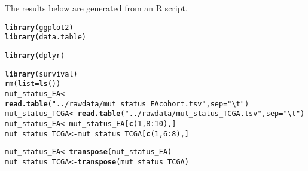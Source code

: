 \documentclass{article}\usepackage[]{graphicx}\usepackage[]{color}
\makeatletter
\newcommand{\hlnum}[1]{\textcolor[rgb]{0.686,0.059,0.569}{#1}}%
\newcommand{\hlstr}[1]{\textcolor[rgb]{0.192,0.494,0.8}{#1}}%
\newcommand{\hlopt}[1]{\textcolor[rgb]{0,0,0}{#1}}%
\newcommand{\hlstd}[1]{\textcolor[rgb]{0.345,0.345,0.345}{#1}}%
\newcommand{\hlkwb}[1]{\textcolor[rgb]{0.69,0.353,0.396}{#1}}%
\newcommand{\hlkwc}[1]{\textcolor[rgb]{0.333,0.667,0.333}{#1}}%
\newcommand{\hlkwd}[1]{\textcolor[rgb]{0.737,0.353,0.396}{\textbf{#1}}}%
\newenvironment{kframe}{%
 \def\at@end@of@kframe{}%
 \ifinner\ifhmode%
  \def\at@end@of@kframe{\end{minipage}}%
  \begin{minipage}{\columnwidth}%
 \fi\fi%
 \def\FrameCommand##1{\hskip\@totalleftmargin \hskip-\fboxsep
 \colorbox{shadecolor}{##1}\hskip-\fboxsep
     \hskip-\linewidth \hskip-\@totalleftmargin \hskip\columnwidth}%
 \MakeFramed {\advance\hsize-\width
   \@totalleftmargin\z@ \linewidth\hsize
   \@setminipage}}%
 {\par\unskip\endMakeFramed%
 \at@end@of@kframe}
\newenvironment{knitrout}{}{} %
\makeatother
\begin{document}
The results below are generated from an R script.

\begin{knitrout}
\color{fgcolor}\begin{kframe}
\begin{alltt}
\hlkwd{library}\hlstd{(ggplot2)}
\hlkwd{library}\hlstd{(data.table)}
\end{alltt}


{\ttfamily\noindent\itshape\color{messagecolor}{\#\# data.table 1.13.6 using 6 threads (see ?getDTthreads).\ \ Latest news: r-datatable.com}}\begin{alltt}
\hlkwd{library}\hlstd{(dplyr)}
\end{alltt}


{\ttfamily\noindent\itshape\color{messagecolor}{\#\# \\\#\# Attaching package: 'dplyr'}}

{\ttfamily\noindent\itshape\color{messagecolor}{\#\# The following objects are masked from 'package:data.table':\\\#\# \\\#\#\ \ \ \  between, first, last}}

{\ttfamily\noindent\itshape\color{messagecolor}{\#\# The following objects are masked from 'package:stats':\\\#\# \\\#\#\ \ \ \  filter, lag}}

{\ttfamily\noindent\itshape\color{messagecolor}{\#\# The following objects are masked from 'package:base':\\\#\# \\\#\#\ \ \ \  intersect, setdiff, setequal, union}}\begin{alltt}
\hlkwd{library}\hlstd{(survival)}
\hlkwd{rm}\hlstd{(}\hlkwc{list}\hlstd{=}\hlkwd{ls}\hlstd{())}
\hlstd{mut_status_EA} \hlkwb{<-} \hlkwd{read.table} \hlstd{(}\hlstr{"../rawdata/mut_status_EAcohort.tsv"}\hlstd{,} \hlkwc{sep}\hlstd{=}\hlstr{"\textbackslash{}t"}\hlstd{)}
\hlstd{mut_status_TCGA} \hlkwb{<-} \hlkwd{read.table} \hlstd{(}\hlstr{"../rawdata/mut_status_TCGA.tsv"}\hlstd{,} \hlkwc{sep}\hlstd{=}\hlstr{"\textbackslash{}t"}\hlstd{)}
\hlstd{mut_status_EA} \hlkwb{<-} \hlstd{mut_status_EA[}\hlkwd{c}\hlstd{(}\hlnum{1}\hlstd{,}\hlnum{8}\hlopt{:}\hlnum{10}\hlstd{),]}
\hlstd{mut_status_TCGA} \hlkwb{<-} \hlstd{mut_status_TCGA[}\hlkwd{c}\hlstd{(}\hlnum{1}\hlstd{,}\hlnum{6}\hlopt{:}\hlnum{8}\hlstd{),]}


\hlstd{mut_status_EA} \hlkwb{<-} \hlkwd{transpose}\hlstd{(mut_status_EA)}
\hlstd{mut_status_TCGA} \hlkwb{<-} \hlkwd{transpose}\hlstd{(mut_status_TCGA)}



\end{alltt}
\end{kframe}
\end{knitrout}
\end{document}
